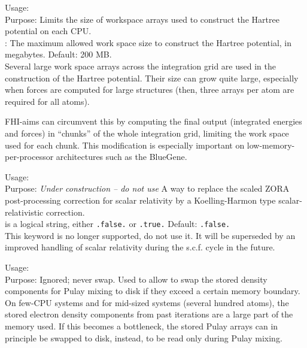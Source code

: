 {
  \noindent
  Usage:   \\[1.0ex]
  Purpose: Limits the size of workspace arrays used to construct the
    Hartree potential on each CPU. \\[1.0ex]
   : The maximum allowed work space size to
    construct the Hartree potential, in megabytes. Default: 200
  MB. \\
}
Several large work space arrays across the integration grid are used
in the construction of the Hartree potential. Their size can grow
quite large, especially when forces are computed for large structures
(then, three arrays per atom are required for all atoms).

FHI-aims can circumvent this by computing the final output (integrated
energies and forces) in ``chunks'' of the whole integration grid,
limiting the work space used for each chunk. This modification is
especially important on low-memory-per-processor architectures such as
the BlueGene.

{
  \noindent
  Usage:   \\[1.0ex]
  Purpose: \emph{Under construction -- do not use} A way to replace
    the scaled ZORA post-processing correction for scalar relativity
    by a Koelling-Harmon type scalar-relativistic
    correction. \\[1.0ex]
   is a logical string, either \texttt{.false.} or
    \texttt{.true.} Default: \texttt{.false.} \\
}
This keyword is no longer supported, do not use it. It will be
superseded by an improved handling of scalar relativity during the
s.c.f. cycle in the future. 

{
  Usage:   \\[1.0ex]
  Purpose: Ignored; never swap.
  Used to allow to swap the stored density components
  for Pulay mixing to disk if they exceed a certain memory boundary. \\[1.0ex] 
}
On few-CPU systems and for mid-sized systems (several hundred atoms),
the stored electron density components from past iterations are a 
large part of the memory used. 
If this becomes a bottleneck, the stored Pulay arrays can in principle be
swapped to disk, instead, to be read only during Pulay mixing.

